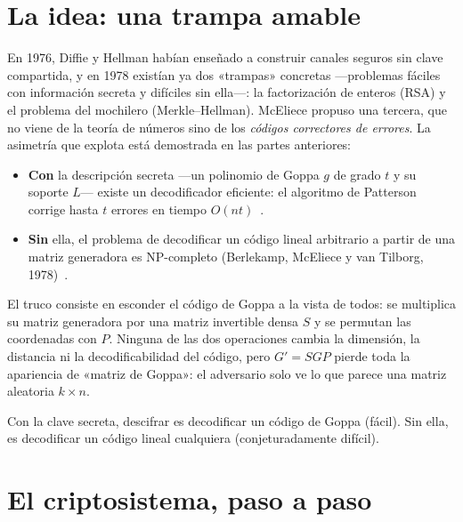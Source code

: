\documentclass[11pt,a4paper,oneside]{report}
\begin{document}
\section{La idea: una trampa amable}

En 1976, Diffie y Hellman habían enseñado a construir canales seguros
sin clave compartida, y en 1978 existían ya dos «trampas» concretas
—problemas fáciles con información secreta y difíciles sin ella—: la
factorización de enteros (RSA) y el problema del mochilero
(Merkle--Hellman). McEliece propuso una tercera, que no viene de la
teoría de números sino de los \emph{códigos correctores de errores}. La
asimetría que explota está demostrada en las partes anteriores:

\begin{itemize}[leftmargin=1.4em,itemsep=3pt]
  \item \textbf{Con} la descripción secreta —un polinomio de Goppa $g$
        de grado $t$ y su soporte $L$— existe un decodificador
        eficiente: el algoritmo de Patterson corrige hasta $t$ errores
        en tiempo $O(nt)$~\cite{patterson1975}.
  \item \textbf{Sin} ella, el problema de decodificar un código lineal
        arbitrario a partir de una matriz generadora es NP-completo
        (Berlekamp, McEliece y van Tilborg, 1978)~\cite{bcmv1978}.
\end{itemize}

El truco consiste en esconder el código de Goppa a la vista de todos: se
multiplica su matriz generadora por una matriz invertible densa $S$ y se
permutan las coordenadas con $P$. Ninguna de las dos operaciones cambia
la dimensión, la distancia ni la decodificabilidad del código, pero
$G'=SGP$ pierde toda la apariencia de «matriz de Goppa»: el adversario
solo ve lo que parece una matriz aleatoria $k\times n$.

\begin{idea}
Con la clave secreta, descifrar es decodificar un código de Goppa
(fácil). Sin ella, es decodificar un código lineal cualquiera
(conjeturadamente difícil).
\end{idea}

\section{El criptosistema, paso a paso}
\end{document}

